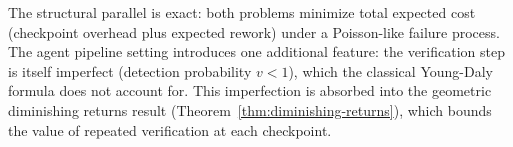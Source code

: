 The structural parallel is exact: both problems minimize total expected cost (checkpoint overhead plus expected rework) under a Poisson-like failure process. The agent pipeline setting introduces one additional feature: the verification step is itself imperfect (detection probability $v < 1$), which the classical Young-Daly formula does not account for. This imperfection is absorbed into the geometric diminishing returns result (Theorem~\ref{thm:diminishing-returns}), which bounds the value of repeated verification at each checkpoint.
